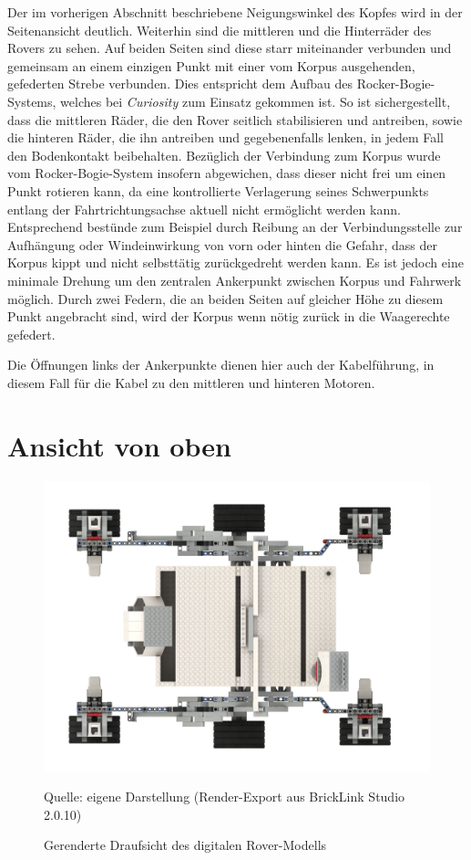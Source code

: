 Der im vorherigen Abschnitt beschriebene Neigungswinkel des Kopfes wird in der Seitenansicht deutlich.
Weiterhin sind die mittleren und die Hinterräder des Rovers zu sehen.
Auf beiden Seiten sind diese starr miteinander verbunden und gemeinsam an einem einzigen Punkt mit einer vom Korpus ausgehenden, gefederten Strebe verbunden.
Dies entspricht dem Aufbau des Rocker-Bogie-Systems, welches bei \textit{Curiosity} zum Einsatz gekommen ist.
So ist sichergestellt, dass die mittleren Räder, die den Rover seitlich stabilisieren und antreiben, sowie die hinteren Räder, die ihn antreiben und gegebenenfalls lenken, in jedem Fall den Bodenkontakt beibehalten.
Bezüglich der Verbindung zum Korpus wurde vom Rocker-Bogie-System insofern abgewichen, dass dieser nicht frei um einen Punkt rotieren kann, da eine kontrollierte Verlagerung seines Schwerpunkts entlang der Fahrtrichtungsachse aktuell nicht ermöglicht werden kann.
Entsprechend bestünde zum Beispiel durch Reibung an der Verbindungsstelle zur Aufhängung oder Windeinwirkung von vorn oder hinten die Gefahr, dass der Korpus kippt und nicht selbsttätig zurückgedreht werden kann.
Es ist jedoch eine minimale Drehung um den zentralen Ankerpunkt zwischen Korpus und Fahrwerk möglich. 
Durch zwei Federn, die an beiden Seiten auf gleicher Höhe zu diesem Punkt angebracht sind, wird der Korpus wenn nötig zurück in die Waagerechte gefedert.

Die Öffnungen links der Ankerpunkte dienen hier auch der Kabelführung, in diesem Fall für die Kabel zu den mittleren und hinteren Motoren.

\section{Ansicht von oben}
\label{sec:draufsicht}

\begin{figure}
	\centering
	\includegraphics[width=\textwidth]{../Images/20200429_Mars_Rover_V5_top.png}
	\vspace{0.5em}
	\parbox[c]{0.8\linewidth}{\footnotesize
		\centering
		\vspace{1em}
		Quelle: eigene Darstellung (Render-Export aus BrickLink Studio 2.0.10)
	}
	\caption{Gerenderte Draufsicht des digitalen Rover-Modells}
	\label{fig:rovertoprender}
\end{figure}

